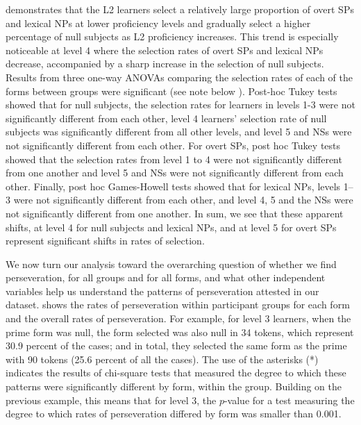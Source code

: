 \documentclass[output=paper]{langscibook}
\begin{document}
 demonstrates that the L2 learners select a relatively large proportion of overt SPs and lexical NPs at lower proficiency levels and gradually select a higher percentage of null subjects as L2 proficiency increases. This trend is especially noticeable at level 4 where the selection rates of overt SPs and lexical NPs decrease, accompanied by a sharp increase in the selection of null subjects. Results from three one-way ANOVAs comparing the selection rates of each of the forms between groups were significant (see note below ). Post-hoc Tukey tests showed that for null subjects, the selection rates for learners in levels 1-3 were not significantly different from each other, level 4 learners’ selection rate of null subjects was significantly different from all other levels, and level 5 and NSs were not significantly different from each other. For overt SPs, post hoc Tukey tests showed that the selection rates from level 1 to 4 were not significantly different from one another and level 5 and NSs were not significantly different from each other. Finally, post hoc Games-Howell tests showed that for lexical NPs, levels 1–3 were not significantly different from each other, and level 4, 5 and the NSs were not significantly different from one another. In sum, we see that these apparent shifts, at level 4 for null subjects and lexical NPs, and at level 5 for overt SPs represent significant shifts in rates of selection.



We now turn our analysis toward the overarching question of whether we find perseveration, for all groups and for all forms, and what other independent variables help us understand the patterns of perseveration attested in our dataset.  shows the rates of perseveration within participant groups for each form and the overall rates of perseveration. For example, for level 3 learners, when the prime form was null, the form selected was also null in 34 tokens, which represent 30.9 percent of the cases; and in total, they selected the same form as the prime with 90 tokens (25.6 percent of all the cases). The use of the asterisks (*) indicates the results of chi-square tests that measured the degree to which these patterns were significantly different by form, within the group. Building on the previous example, this means that for level 3, the $p$-value for a test measuring the degree to which rates of perseveration differed by form was smaller than 0.001.
\end{document}
